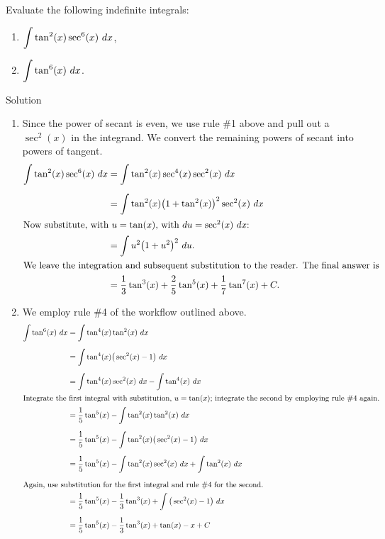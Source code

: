 \begin{example}
Evaluate the following indefinite integrals:
\begin{multicols}{2}
\begin{enumerate}
\item  $\ds\int \tan^2(x)\sec^6(x)\ dx$,
\item   $\displaystyle\int\tan^6(x)\ dx$.
\end{enumerate}
\end{multicols}

Solution 

\begin{enumerate}
\item Since the power of secant is even, we use rule \#1 above  and pull out a $\sec^2(x)$ in the integrand. We convert the remaining powers of secant into powers of tangent.
\begin{align*}
\int \tan^2(x)\sec^6(x)\ dx &= \int\tan^2(x)\sec^4(x)\sec^2(x)\ dx \\[0.2cm]
		&= \int \tan^2(x)\big(1+\tan^2(x)\big)^2\sec^2(x)\ dx \\
\intertext{Now substitute, with $u=\tan(x)$, with $du = \sec^2(x)\ dx$:}
		&=\int u^2\big(1+u^2\big)^2\ du.\\
\intertext{We leave the integration and subsequent substitution to the reader. The final answer is}
		&=\frac13\tan^3(x)+\frac25\tan^5(x)+\frac17\tan^7(x)+C.
\end{align*}
\item We employ rule \#4 of the workflow outlined above. 
\begin{align*}
\int \tan^6(x)\ dx &= \int \tan^4(x)\tan^2(x)\ dx \\[0.2cm]
			&= \int\tan^4(x)\big(\sec^2(x)-1\big)\ dx\\[0.2cm]
			&= \int\tan^4(x)\sec^2(x)\ dx - \int\tan^4(x)\ dx \\
\intertext{Integrate the first integral with substitution, $u=\tan (x)$; integrate the second by employing rule \#4 again.}
			&=	\frac15\tan^5(x)-\int\tan^2(x)\tan^2(x)\ dx\\[0.2cm]
			&=	\frac15\tan^5(x)-\int\tan^2(x)\big(\sec^2(x)-1\big)\ dx \\[0.2cm]
			&= \frac15\tan^5(x) -\int\tan^2(x)\sec^2(x)\ dx + \int\tan^2(x)\ dx\\[0.2cm]
\intertext{Again, use substitution for the first integral and rule \#4 for the second.}
			&= \frac15\tan^5(x)-\frac13\tan^3(x)+\int\big(\sec^2(x)-1\big)\ dx \\[0.2cm]
			&=	 \frac15\tan^5(x)-\frac13\tan^3(x)+\tan(x) - x+C
\end{align*}
\end{enumerate}
\end{example}

